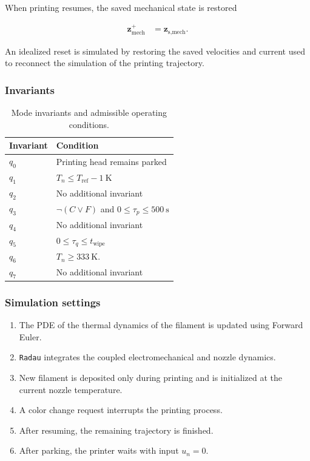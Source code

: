 \documentclass[a4paper,11pt]{article}
\begin{document}
When printing resumes, the saved mechanical state is restored 

\begin{align}
    \mathbf{z}_{\text{mech}}^+ &= \mathbf{z}_{\text{s,mech}}.
\end{align}

An idealized reset is simulated by restoring the saved velocities and current used to reconnect the simulation of the printing trajectory.

\subsubsection{Invariants}

\begin{table}[htbp]
    \centering
    \caption{Mode invariants and admissible operating conditions.}
    \label{tab:invariants}
    \small
    \begin{tabularx}{0.8\linewidth}{
        @{}
        l
        >{\raggedright\arraybackslash}X
        @{}
    }
        \toprule
        \textbf{Invariant} & \textbf{Condition} \\
        \midrule
        $q_0$   & Printing head remains parked\\
        $q_1$   & $T_n \le T_{\text{ref}} - \SI{1}{\kelvin}$\\
        $q_2$   & No additional invariant\\
        $q_3$   & $\lnot (C \lor F)$ and $0 \leq \tau_p \le \SI{500}{\second}$\\
        $q_4$   & No additional invariant\\
        $q_5$   & $0 \leq \tau_q \le t_{\text{wipe}}$ \\
        $q_6$   & $T_n \geq \SI{333}{\kelvin}$. \\
        $q_7$   & No additional invariant\\
        \bottomrule
    \end{tabularx}
\end{table}

\subsubsection{Simulation settings}
\begin{enumerate}
    \item The PDE of the thermal dynamics of the filament is updated using Forward Euler.
    \item \texttt{Radau} integrates the coupled electromechanical and nozzle dynamics.
    \item New filament is deposited only during printing and is initialized at the current nozzle temperature.
    \item A color change request interrupts the printing process.
    \item After resuming, the remaining trajectory is finished.
    \item After parking, the printer waits with input $u_n=0$.
\end{enumerate}
\end{document}
